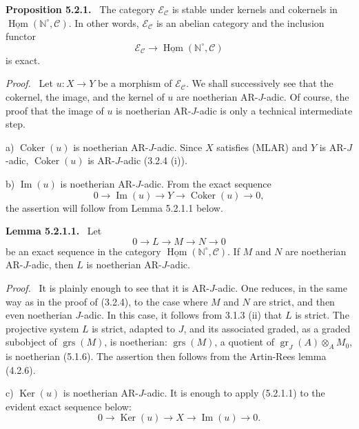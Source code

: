 \documentclass[11pt]{article}
\providecommand{\uHom}{\underline{\Hom}}
\newenvironment{statement}[1]{\par\medskip\noindent\textbf{#1.}\ }{\par\medskip}
\newenvironment{prooftext}[1][Proof]{\par\noindent\emph{#1.}\ }{\par\medskip}
\DeclareMathOperator{\Hom}{Hom}
\providecommand{\Ker}{\operatorname{Ker}}
\providecommand{\Coker}{\operatorname{Coker}}
\providecommand{\gr}{\operatorname{gr}}
\providecommand{\Hom}{\operatorname{Hom}}
\providecommand{\Im}{\operatorname{Im}}
\providecommand{\Ker}{\operatorname{Ker}}
\providecommand{\Coker}{\operatorname{Coker}}
\providecommand{\gr}{\operatorname{gr}}
\renewcommand{\Im}{\operatorname{Im}}
\providecommand{\gr}{\operatorname{gr}}
\providecommand{\grs}{\operatorname{grs}}
\providecommand{\Ker}{\operatorname{Ker}}
\providecommand{\Coker}{\operatorname{Coker}}
\providecommand{\Im}{\operatorname{Im}}
\providecommand{\Hom}{\operatorname{Hom}}
\begin{document}
\begin{statement}{Proposition 5.2.1}
The category \(\mathcal E_{\mathcal C}\) is stable under kernels and cokernels in \(\uHom(\mathbb N^\circ,\mathcal C)\). In other words, \(\mathcal E_{\mathcal C}\) is an abelian category and the inclusion functor
\[
\mathcal E_{\mathcal C}\longrightarrow \uHom(\mathbb N^\circ,\mathcal C)
\]
is exact.
\end{statement}

\begin{prooftext}
Let \(u:X\to Y\) be a morphism of \(\mathcal E_{\mathcal C}\). We shall successively see that the cokernel, the image, and the kernel of \(u\) are noetherian AR-\(J\)-adic. Of course, the proof that the image of \(u\) is noetherian AR-\(J\)-adic is only a technical intermediate step.

a) \(\Coker(u)\) is noetherian AR-\(J\)-adic. Since \(X\) satisfies (MLAR) and \(Y\) is AR-\(J\)-adic, \(\Coker(u)\) is AR-\(J\)-adic (3.2.4 (i)).

b) \(\Im(u)\) is noetherian AR-\(J\)-adic. From the exact sequence
\[
0\longrightarrow \Im(u)\longrightarrow Y\longrightarrow \Coker(u)\longrightarrow 0,
\]
the assertion will follow from Lemma 5.2.1.1 below.
\end{prooftext}

\begin{statement}{Lemma 5.2.1.1}
Let
\[
0\longrightarrow L\longrightarrow M\longrightarrow N\longrightarrow0
\]
be an exact sequence in the category \(\uHom(\mathbb N^\circ,\mathcal C)\). If \(M\) and \(N\) are noetherian AR-\(J\)-adic, then \(L\) is noetherian AR-\(J\)-adic.
\end{statement}

\begin{prooftext}
It is plainly enough to see that it is AR-\(J\)-adic. One reduces, in the same way as in the proof of (3.2.4), to the case where \(M\) and \(N\) are strict, and then even noetherian \(J\)-adic. In this case, it follows from 3.1.3 (ii) that \(L\) is strict. The projective system \(L\) is strict, adapted to \(J\), and its associated graded, as a graded subobject of \(\grs(M)\), is noetherian: \(\grs(M)\), a quotient of \(\gr_J(A)\otimes_A M_0\), is noetherian (5.1.6). The assertion then follows from the Artin-Rees lemma (4.2.6).
\end{prooftext}

c) \(\Ker(u)\) is noetherian AR-\(J\)-adic. It is enough to apply (5.2.1.1) to the evident exact sequence below:
\[
0\longrightarrow \Ker(u)\longrightarrow X\longrightarrow \Im(u)\longrightarrow0.
\]
\end{document}
